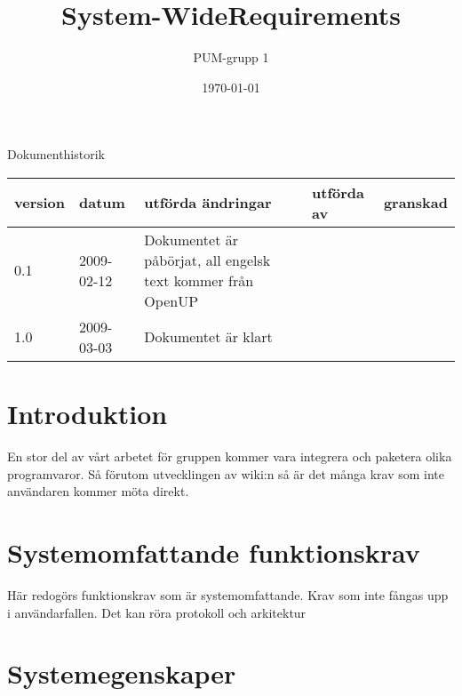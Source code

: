 

\ifpdf
\else
\fi

\title{System-WideRequirements}
\author{PUM-grupp 1}
\date{\today}



\maketitle\thispagestyle{empty}

\newpage

{\centering \Large{Dokumenthistorik\\}}

\vspace{10pt}
\begin{tabularx}{\textwidth}{ |l|l|X|l|l| }
  \hline
    \textbf{version} & \textbf{datum} & \textbf{utförda ändringar} & \textbf{utförda av} & \textbf{granskad} \\
	\hline 
  0.1 & 2009-02-12 &  Dokumentet är påbörjat, all engelsk text kommer från OpenUP & &   \\
  \hline
  1.0 & 2009-03-03 & Dokumentet är klart & & \\
  \hline
\end{tabularx}

\newpage

\setcounter{tocdepth}{2}
\tableofcontents
\newpage

\section{Introduktion}
En stor del av vårt arbetet för gruppen kommer vara integrera och paketera olika programvaror. Så förutom utvecklingen av wiki:n så är det många krav som inte användaren kommer möta direkt.

\section{Systemomfattande funktionskrav}
Här redogörs funktionskrav som är systemomfattande. Krav som inte fångas upp i användarfallen. Det kan röra protokoll och arkitektur 

\section{Systemegenskaper}
